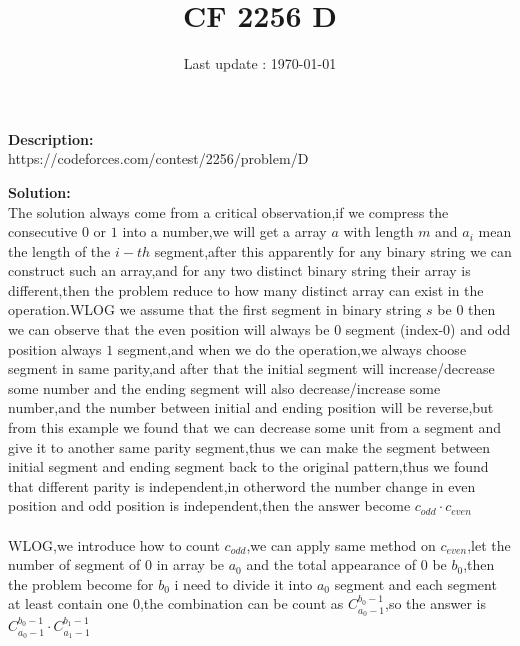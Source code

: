 \documentclass{article}
\begin{document}
\title{\textbf{CF 2256 D}}
\author{}
\date{Last update : \today}

\maketitle

\noindent \textbf{Description:}\\
https://codeforces.com/contest/2256/problem/D

\noindent \textbf{Solution:}\\
The solution always come from a critical observation,if we compress the consecutive $0$ or $1$ into a number,we will get a array $a$ with length $m$ and $a_i$ mean the length of the $i-th$ segment,after this apparently for any binary string we can construct such an array,and for any two distinct binary string their array is different,then the problem reduce to how many distinct array can exist in the operation.WLOG we assume that the first segment in binary string $s$ be $0$ then we can observe that the even position will always be $0$ segment (index-$0$) and odd position always $1$ segment,and when we do the operation,we always choose segment in same parity,and after that the initial segment will increase/decrease some number and the ending segment will also decrease/increase some number,and the number between initial and ending position will be reverse,but from this example we found that we can decrease some unit from a segment and give it to another same parity segment,thus we can make the segment between initial segment and ending segment back to the original pattern,thus we found that different parity is independent,in otherword the number change in even position and odd position is independent,then the answer become $c_{odd}\cdot c_{even}$\\
\\
WLOG,we introduce how to count $c_{odd}$,we can apply same method on $c_{even}$,let the number of segment of $0$ in array be $a_0$ and the total appearance of $0$ be $b_0$,then the problem become for $b_0$ i need to divide it into $a_0$ segment and each segment at least contain one $0$,the combination can be count as $C^{b_0-1}_{a_0-1}$,so the answer is $C^{b_0-1}_{a_0-1}\cdot C^{b_1-1}_{a_1-1}$
\end{document}
